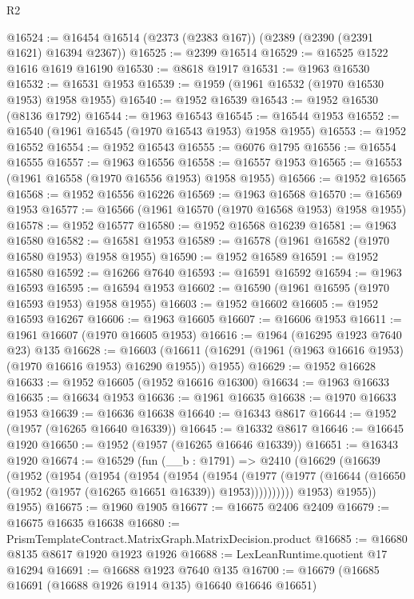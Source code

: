 \begin{lexlean}{R2}
\begin{coremodule}
@16524 := @16454 @16514 (@2373 (@2383 @167)) (@2389 (@2390 (@2391 @1621) @16394 @2367))
@16525 := @2399 @16514
@16529 := @16525 @1522 @1616 @1619 @16190
@16530 := @8618 @1917
@16531 := @1963 @16530
@16532 := @16531 @1953
@16539 := @1959 (@1961 @16532 (@1970 @16530 @1953) @1958 @1955)
@16540 := @1952 @16539
@16543 := @1952 @16530 (@8136 @1792)
@16544 := @1963 @16543
@16545 := @16544 @1953
@16552 := @16540 (@1961 @16545 (@1970 @16543 @1953) @1958 @1955)
@16553 := @1952 @16552
@16554 := @1952 @16543
@16555 := @6076 @1795
@16556 := @16554 @16555
@16557 := @1963 @16556
@16558 := @16557 @1953
@16565 := @16553 (@1961 @16558 (@1970 @16556 @1953) @1958 @1955)
@16566 := @1952 @16565
@16568 := @1952 @16556 @16226
@16569 := @1963 @16568
@16570 := @16569 @1953
@16577 := @16566 (@1961 @16570 (@1970 @16568 @1953) @1958 @1955)
@16578 := @1952 @16577
@16580 := @1952 @16568 @16239
@16581 := @1963 @16580
@16582 := @16581 @1953
@16589 := @16578 (@1961 @16582 (@1970 @16580 @1953) @1958 @1955)
@16590 := @1952 @16589
@16591 := @1952 @16580
@16592 := @16266 @7640
@16593 := @16591 @16592
@16594 := @1963 @16593
@16595 := @16594 @1953
@16602 := @16590 (@1961 @16595 (@1970 @16593 @1953) @1958 @1955)
@16603 := @1952 @16602
@16605 := @1952 @16593 @16267
@16606 := @1963 @16605
@16607 := @16606 @1953
@16611 := @1961 @16607 (@1970 @16605 @1953)
@16616 := @1964 (@16295 @1923 @7640 @23) @135
@16628 := @16603
    (@16611 (@16291 (@1961 (@1963 @16616 @1953) (@1970 @16616 @1953) @16290 @1955)) @1955)
@16629 := @1952 @16628
@16633 := @1952 @16605 (@1952 @16616 @16300)
@16634 := @1963 @16633
@16635 := @16634 @1953
@16636 := @1961 @16635
@16638 := @1970 @16633 @1953
@16639 := @16636 @16638
@16640 := @16343 @8617
@16644 := @1952 (@1957 (@16265 @16640 @16339))
@16645 := @16332 @8617
@16646 := @16645 @1920
@16650 := @1952 (@1957 (@16265 @16646 @16339))
@16651 := @16343 @1920
@16674 := @16529
    (fun (__b : @1791) =>
    @2410
      (@16629
        (@16639
          (@1952
            (@1954
              (@1954
                (@1954
                  (@1954
                    (@1954
                      (@1977
                        (@1977 (@16644 (@16650 (@1952 (@1957 (@16265 @16651 @16339)) @1953))))))))))
            @1953)
          @1955))
      @1955)
@16675 := @1960 @1905
@16677 := @16675 @2406 @2409
@16679 := @16675 @16635 @16638
@16680 := PrismTemplateContract.MatrixGraph.MatrixDecision.product
@16685 := @16680 @8135 @8617 @1920 @1923 @1926
@16688 := LexLeanRuntime.quotient @17 @16294
@16691 := @16688 @1923 @7640 @135
@16700 := @16679 (@16685 @16691 (@16688 @1926 @1914 @135) @16640 @16646 @16651)

\end{coremodule}
\end{lexlean}

